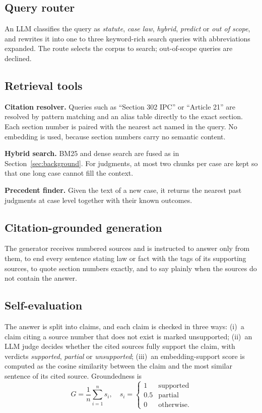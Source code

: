 \documentclass[conference]{IEEEtran}
\begin{document}
\subsection{Query router}
An LLM classifies the query as \emph{statute}, \emph{case law}, \emph{hybrid}, \emph{predict} or \emph{out of scope}, and rewrites it into one to three keyword-rich search queries with abbreviations expanded. The route selects the corpus to search; out-of-scope queries are declined.

\subsection{Retrieval tools}
\textbf{Citation resolver.} Queries such as ``Section 302 IPC'' or ``Article 21'' are resolved by pattern matching and an alias table directly to the exact section. Each section number is paired with the nearest act named in the query. No embedding is used, because section numbers carry no semantic content.

\textbf{Hybrid search.} BM25 and dense search are fused as in Section~\ref{sec:background}. For judgments, at most two chunks per case are kept so that one long case cannot fill the context.

\textbf{Precedent finder.} Given the text of a new case, it returns the nearest past judgments at case level together with their known outcomes.

\subsection{Citation-grounded generation}
The generator receives numbered sources and is instructed to answer only from them, to end every sentence stating law or fact with the tags of its supporting sources, to quote section numbers exactly, and to say plainly when the sources do not contain the answer.

\subsection{Self-evaluation}
The answer is split into claims, and each claim is checked in three ways: (i)~a claim citing a source number that does not exist is marked unsupported; (ii)~an LLM judge decides whether the cited sources fully support the claim, with verdicts \emph{supported}, \emph{partial} or \emph{unsupported}; (iii)~an embedding-support score is computed as the cosine similarity between the claim and the most similar sentence of its cited source. Groundedness is
\begin{equation}
G=\frac{1}{n}\sum_{i=1}^{n}s_i,\quad s_i=\begin{cases}1 & \text{supported}\\ 0.5 & \text{partial}\\ 0 & \text{otherwise.}\end{cases}
\end{equation}
\end{document}
